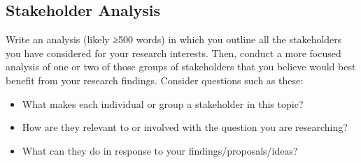 \documentclass[10pt]{amsart}	%
\begin{document}
\begin{comment}
	In brief, you need to accomplish these tasks before you can write the report:
	\begin{enumerate}
		\item Brainstorm some of the people who might be the most interested in or affected by the implications of your research question. Choose one or two of these groups of stakeholders to focus on as a possible audience for your final project. (In short, who cares about your opinions? Whom do you need to convince to take what kind of action?)
		\item Determine the “genre sets” used by that group of stakeholders. (How do those people communicate? What persuades them?)
		\item Analyze the characteristics of one genre used by your stakeholder. Determine what you need to know to be able to competently use that genre to get your stakeholders to take action.
		\item Conduct original research to add to the current knowledge on the topic.
		\item Analyze the data you collect so you can present it meaningfully to an audience with limited familiarity with your topic (i.e. your instructor).
	\end{enumerate}
\end{comment}

\subsection{Stakeholder Analysis} %
\label{sub:stakeholder_analysis}
Write an analysis (likely ≥500 words) in which you outline all the stakeholders you have considered for your research interests. Then, conduct a more focused analysis of one or two of those groups of stakeholders that you believe would best benefit from your research findings. Consider questions such as these:
	\begin{itemize}
		\item What makes each individual or group a stakeholder in this topic?
		\item  How are they relevant to or involved with the question you are researching?
		\item  What can they do in response to your findings/proposals/ideas?
	\end{itemize}
\end{document}
